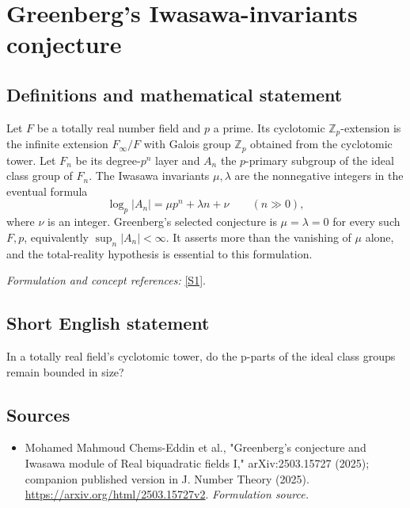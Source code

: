 \documentclass[11pt]{article}
\begin{document}
\section*{\texorpdfstring{Greenberg's Iwasawa-invariants conjecture}{Greenberg's Iwasawa-invariants conjecture}}\label{9400050}
\subsection{Definitions and mathematical statement}
Let $F$ be a totally real number field and $p$ a prime. Its cyclotomic ${\mathbb{Z}}_p$-extension is the infinite extension $F_\infty/F$ with Galois group ${\mathbb{Z}}_p$ obtained from the cyclotomic tower. Let $F_n$ be its degree-$p^n$ layer and $A_n$ the $p$-primary subgroup of the ideal class group of $F_n$. The Iwasawa invariants $\mu,\lambda$ are the nonnegative integers in the eventual formula
\[
 \log_p|A_n|=\mu p^n+\lambda n+\nu\qquad(n\gg0),
\]
where $\nu$ is an integer. Greenberg's selected conjecture is $\mu=\lambda=0$ for every such $F,p$, equivalently $\sup_n|A_n|<\infty$. It asserts more than the vanishing of $\mu$ alone, and the total-reality hypothesis is essential to this formulation.
\par\smallskip\textit{Formulation and concept references:} \href{https://arxiv.org/html/2503.15727v2}{[S1]}.

\subsection{Short English statement}
In a totally real field's cyclotomic tower, do the p-parts of the ideal class groups remain bounded in size?
\subsection{Sources}
\begin{itemize}
\item[S1]Mohamed Mahmoud Chems-Eddin et al., "Greenberg's conjecture and Iwasawa module of Real biquadratic fields I," arXiv:2503.15727 (2025); companion published version in J. Number Theory (2025).
\url{https://arxiv.org/html/2503.15727v2}.
\textit{Formulation source.}
\end{itemize}
\end{document}
